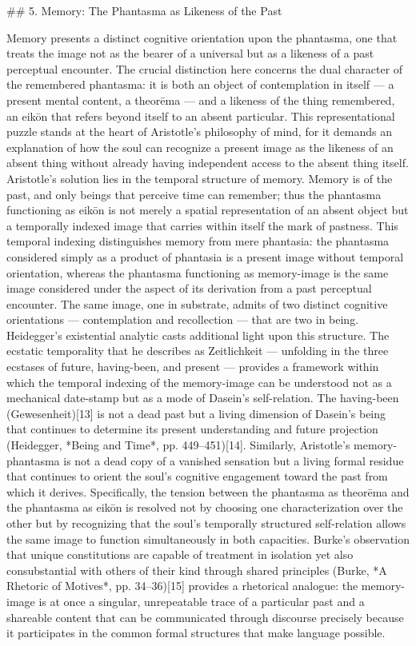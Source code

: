 ## 5. Memory: The Phantasma as Likeness of the Past

Memory presents a distinct cognitive orientation upon the phantasma, one that treats the image not as the bearer of a universal but as a likeness of a past perceptual encounter. The crucial distinction here concerns the dual character of the remembered phantasma: it is both an object of contemplation in itself — a present mental content, a theorēma — and a likeness of the thing remembered, an eikōn that refers beyond itself to an absent particular. This representational puzzle stands at the heart of Aristotle's philosophy of mind, for it demands an explanation of how the soul can recognize a present image as the likeness of an absent thing without already having independent access to the absent thing itself. Aristotle's solution lies in the temporal structure of memory. Memory is of the past, and only beings that perceive time can remember; thus the phantasma functioning as eikōn is not merely a spatial representation of an absent object but a temporally indexed image that carries within itself the mark of pastness. This temporal indexing distinguishes memory from mere phantasia: the phantasma considered simply as a product of phantasia is a present image without temporal orientation, whereas the phantasma functioning as memory-image is the same image considered under the aspect of its derivation from a past perceptual encounter. The same image, one in substrate, admits of two distinct cognitive orientations — contemplation and recollection — that are two in being. Heidegger's existential analytic casts additional light upon this structure. The ecstatic temporality that he describes as Zeitlichkeit — unfolding in the three ecstases of future, having-been, and present — provides a framework within which the temporal indexing of the memory-image can be understood not as a mechanical date-stamp but as a mode of Dasein's self-relation. The having-been (Gewesenheit)[13] is not a dead past but a living dimension of Dasein's being that continues to determine its present understanding and future projection (Heidegger, *Being and Time*, pp. 449–451)[14]. Similarly, Aristotle's memory-phantasma is not a dead copy of a vanished sensation but a living formal residue that continues to orient the soul's cognitive engagement toward the past from which it derives. Specifically, the tension between the phantasma as theorēma and the phantasma as eikōn is resolved not by choosing one characterization over the other but by recognizing that the soul's temporally structured self-relation allows the same image to function simultaneously in both capacities. Burke's observation that unique constitutions are capable of treatment in isolation yet also consubstantial with others of their kind through shared principles (Burke, *A Rhetoric of Motives*, pp. 34–36)[15] provides a rhetorical analogue: the memory-image is at once a singular, unrepeatable trace of a particular past and a shareable content that can be communicated through discourse precisely because it participates in the common formal structures that make language possible. 

